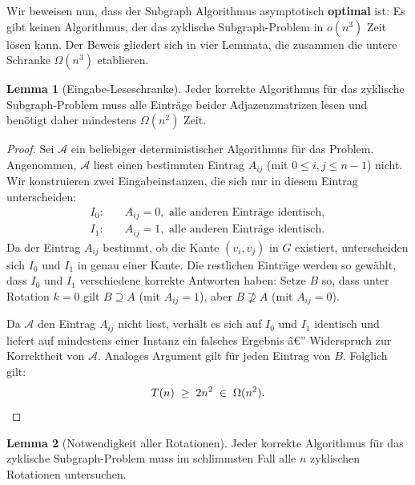 ﻿\documentclass[a4paper,12pt]{article}
\theoremstyle{definition}
\newtheorem{lemma}{Lemma}
\begin{document}
Wir beweisen nun, dass der Subgraph Algorithmus asymptotisch \textbf{optimal} ist:
Es gibt keinen Algorithmus, der das zyklische Subgraph-Problem in $o(n^3)$ Zeit lösen kann.
Der Beweis gliedert sich in vier Lemmata, die zusammen die untere Schranke $\Omega(n^3)$ etablieren.

\begin{lemma}[Eingabe-Leseschranke]
\label{lem:eingabe}
Jeder korrekte Algorithmus für das zyklische Subgraph-Problem muss alle Einträge beider Adjazenzmatrizen lesen und benötigt daher mindestens $\Omega(n^2)$ Zeit.
\end{lemma}

\begin{proof}
Sei $\mathcal{A}$ ein beliebiger deterministischer Algorithmus für das Problem.
Angenommen, $\mathcal{A}$ liest einen bestimmten Eintrag $A_{ij}$ (mit $0 \le i, j \le n-1$) nicht.
Wir konstruieren zwei Eingabeinstanzen, die sich nur in diesem Eintrag unterscheiden:
\begin{align*}
	I_0: &\quad A_{ij} = 0, \text{ alle anderen Einträge identisch}, \\
	I_1: &\quad A_{ij} = 1, \text{ alle anderen Einträge identisch.}
\end{align*}
Da der Eintrag $A_{ij}$ bestimmt, ob die Kante $(v_i, v_j)$ in $G$ existiert, unterscheiden sich $I_0$ und $I_1$ in genau einer Kante.
Die restlichen Einträge werden so gewählt, dass $I_0$ und $I_1$ verschiedene korrekte Antworten haben:
Setze $B$ so, dass unter Rotation $k = 0$ gilt $B \supseteq A$ (mit $A_{ij} = 1$), aber $B \not\supseteq A$ (mit $A_{ij} = 0$).

Da $\mathcal{A}$ den Eintrag $A_{ij}$ nicht liest, verhält es sich auf $I_0$ und $I_1$ identisch und liefert auf mindestens einer Instanz ein falsches Ergebnis â€” Widerspruch zur Korrektheit von $\mathcal{A}$.
Analoges Argument gilt für jeden Eintrag von $B$.
Folglich gilt:
\[
	T(n) \;\geq\; 2n^2 \;\in\; \Omega(n^2). \qedhere
\]
\end{proof}

\begin{lemma}[Notwendigkeit aller Rotationen]
\label{lem:rotationen}
Jeder korrekte Algorithmus für das zyklische Subgraph-Problem muss im schlimmsten Fall alle $n$ zyklischen Rotationen untersuchen.
\end{lemma}
\end{document}
